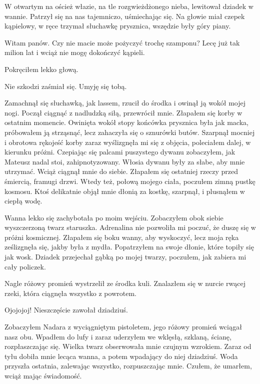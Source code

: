W otwartym na oścież włazie, na tle rozgwieżdżonego nieba, lewitował dziadek w wannie.
Patrzył się na nas tajemniczo, uśmiechając się. Na głowie miał czepek kąpielowy, w ręce trzymał słuchawkę prysznica, wszędzie były góry piany.
\begin{dialogue}
\ds{} Witam panów. Czy nie macie może pożyczyć trochę szamponu? Lecę już tak milion lat i wciąż nie mogę dokończyć kąpieli.
\end{dialogue}
Pokręciłem lekko głową.
\begin{dialogue}
\ds{} Nie szkodzi \dm{} zaśmiał się. \dm{} Umyję się tobą.
\end{dialogue}
Zamachnął się słuchawką, jak lassem, rzucił do środka i owinął ją wokół mojej nogi.
Począł ciągnąć z nadludzką siłą, przewrócił mnie. Złapałem się korby w ostatnim momencie.
Owinięta wokół stopy końcówka prysznica była jak macka, próbowałem ją strząsnąć, lecz zahaczyła się o sznurówki butów.
Szarpnął mocniej i obrotowa rękojeść korby zaraz wyślizgnęła mi się z objęcia, poleciałem dalej, w kierunku próżni.
Czepiając się palcami puszystego dywanu zobaczyłem, jak Mateusz nadal stoi, zahipnotyzowany.
Włosia dywanu były za słabe, aby mnie utrzymać. Wciąż ciągnął mnie do siebie. Złapałem się ostatniej rzeczy przed śmiercią, framugi drzwi.
Wtedy też, połową mojego ciała, poczułem zimną pustkę kosmosu.
Ktoś delikatnie objął mnie dłonią za kostkę, szarpnął, i plusnąłem w ciepłą wodę.

Wanna lekko się zachybotała po moim wejściu.
Zobaczyłem obok siebie wyszczerzoną twarz staruszka.
Adrenalina nie pozwoliła mi poczuć, że duszę się w próżni kosmicznej.
Złapałem się boku wanny, aby wyskoczyć, lecz moja ręka ześlizgnęła się, jakby była z mydła.
Popatrzyłem na swoje dłonie, które topiły się jak wosk.
Dziadek przejechał gąbką po mojej twarzy, poczułem, jak zabiera mi cały policzek.

Nagle różowy promień wystrzelił ze środka kuli.
Znalazłem się w nurcie rwącej rzeki, która ciągnęła wszystko z powrotem.
\begin{dialogue}
\ds{} Ojojojoj! Nieszczęście \dm{} zawołał dziadziuś.
\end{dialogue}
Zobaczyłem Nadara z wyciągniętym pistoletem, jego różowy promień wciągał nasz obu. Wpadłem do lufy i zaraz uderzyłem we wklęsłą, szklaną, ścianę, rozpłaszczając się.
Wielka twarz obserwowała mnie czujnym wzrokiem.
Zaraz od tyłu dobiła mnie lecąca wanna, a potem wpadający do niej dziadziuś.
Woda przyszła ostatnia, zalewając wszystko, rozpuszczając mnie.
Czułem, że umarłem, wciąż mając świadomość.

